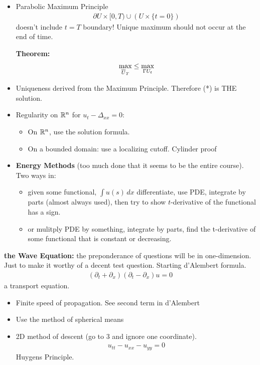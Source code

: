 \documentclass[12pt,a4paper]{report}
\begin{document}
{\begin{description}
\begin{itemize}
		\item Parabolic Maximum Principle 
		\begin{align*}
			\partial U \times [0, T) \cup ( U\times \{t=0\} )
		\end{align*}  doesn't include $t=T$ boundary!  Unique maximum should not occur at the end of time.
		
		\textbf{Theorem: } \begin{align*}
			\max_{\overline{U}_T} \le \max_{\Gamma U_t}
		\end{align*}
		\item Uniqueness derived from the Maximum Principle.  Therefore (*) is THE solution.
		
		\item Regularity on $\mathbb{R}^n$ for $u_t - \Delta_{xx}=0$: 
		\begin{itemize}
			\item On $\mathbb{R}^n$, use the solution formula.
			\item On a bounded domain: use a localizing cutoff.  Cylinder proof
		\end{itemize}
		
		\item \textbf{Energy Methods} (too much done that it seems to be the entire course).  Two ways in: 
		\begin{itemize}
		\item given some functional, $\int u(s)\,dx$ differentiate, use PDE, integrate by parts (almost always used), then try to show $t$-derivative of the functional has a sign.
		
		\item or mulitply PDE by something, integrate by parts, find the t-derivative of some functional that is constant or decreasing.
		
		\end{itemize}
	\end{itemize}
	
	\item \textbf{the Wave Equation:} the preponderance of questions will be in one-dimension.  Just to make it worthy of a decent test question.  Starting d'Alembert formula.
	\begin{align*}
		(\partial_t+\partial_x)(\partial_t-\partial_x)u = 0
	\end{align*}a transport equation. 
	
	\begin{itemize}
		\item Finite speed of propagation.  See second term in d'Alembert
		\item Use the method of spherical means
		\item 2D method of descent (go to 3 and ignore one coordinate).
		\begin{align*}
			u_{tt}-u_{xx}- u_{yy} = 0
         \end{align*}	Huygens Principle.
         

\end{itemize}
\end{description}}
\end{document}
